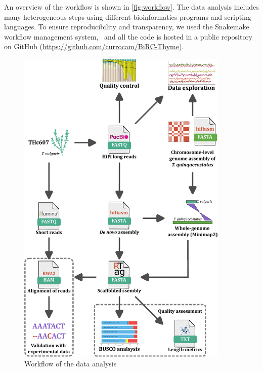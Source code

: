 An overview of the workflow is shown in \autoref{fig:workflow}. The data analysis includes many heterogeneous steps using different bioinformatics programs and scripting languages. To ensure reproducibility and transparency, we used the Snakemake workflow management system,~\cite{molderSustainableDataAnalysis2021} and all the code is hosted in a public repository on GitHub (\url{https://github.com/currocam/BiRC-Thyme}).\\

\begin{figure}[ht!]
    \begin{center}
        \includegraphics[width=0.9\textwidth]{gfx/methods.pdf}
        \caption{Workflow of the data analysis}   
        \label{fig:workflow}
 
    \end{center}
\end{figure}  


